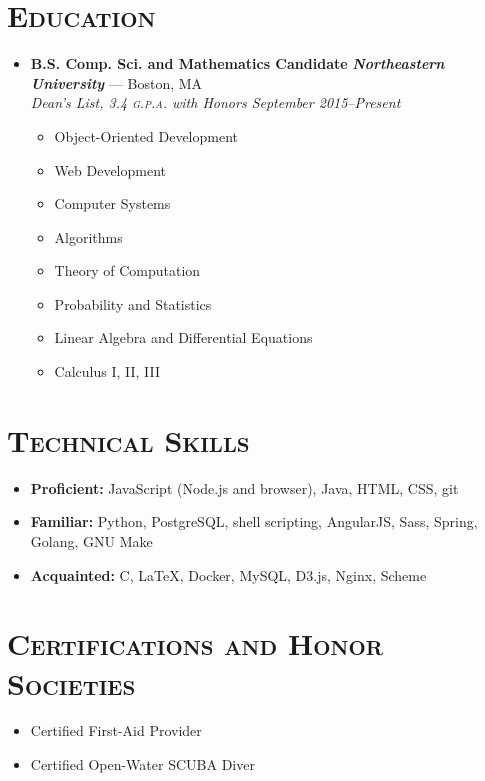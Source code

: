\documentclass[11pt]{article}
\begin{document}
\section*{\textsc{Education}}
\begin{itemize}
\item \textbf{B.S. Comp. Sci. and Mathematics Candidate} \hfill \textit{\textbf{Northeastern University}} --- Boston, MA \\ \em{Dean's List}, 3.4 \textsc{g.p.a.} with Honors \hfill {\em September 2015--Present}
  \begin{itemize}
  \item Object-Oriented Development
  \item Web Development
  \item Computer Systems
  \item Algorithms
  \item Theory of Computation
  \item Probability and Statistics
  \item Linear Algebra and Differential Equations
  \item Calculus I, II, III
  \end{itemize}
\end{itemize}



\section*{\textsc{Technical Skills}}
\begin{itemize}
\item \textbf{Proficient:} JavaScript (Node.js and browser), Java, HTML, CSS, git
\item \textbf{Familiar:} Python, PostgreSQL, shell scripting, AngularJS, Sass, Spring, Golang, GNU Make
  \item \textbf{Acquainted:} C, LaTeX, Docker, MySQL, D3.js, Nginx, Scheme
\end{itemize}



\section*{\textsc{Certifications and Honor Societies}}
\begin{itemize}
\item Certified First-Aid Provider
\item Certified Open-Water SCUBA Diver
\end{itemize}
\end{document}
